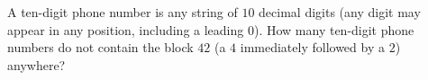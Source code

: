 A ten-digit phone number is any string of $10$ decimal digits (any digit may appear in any position, including a leading $0$). How many ten-digit phone numbers do not contain the block $42$ (a $4$ immediately followed by a $2$) anywhere?
